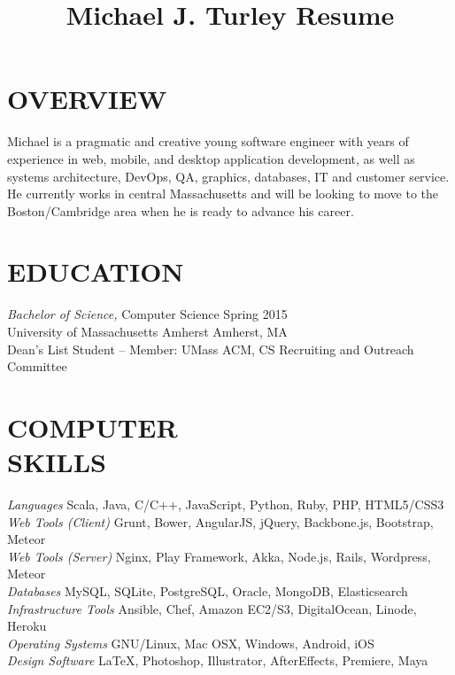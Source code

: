 \documentclass[line,margin]{res}
\begin{document}
\title{Michael J. Turley Resume}

\address{837 Partridgeville Road Unit D2, Athol, MA 01331}
\address{781-264-6283  |  mike@miketurley.com | github.com/mturley}

\begin{resume}
 
\section{OVERVIEW}
    Michael is a pragmatic and creative young software engineer with years of experience in web, mobile, and desktop application development, as well as systems architecture, DevOps, QA, graphics, databases, IT and customer service.  He currently works in central Massachusetts and will be looking to move to the Boston/Cambridge area when he is ready to advance his career.
 
\section{EDUCATION}
    {\sl Bachelor of Science,} Computer Science \hfill Spring 2015 \\
    University of Massachusetts Amherst \hfill Amherst, MA \\
    Dean's List Student -- Member: UMass ACM, CS Recruiting and Outreach Committee

 
\section{COMPUTER \\ SKILLS}
    {\sl Languages} \hfill Scala, Java, C/C++, JavaScript, Python, Ruby, PHP, HTML5/CSS3 \\
    {\sl Web Tools (Client)} \hfill Grunt, Bower, AngularJS, jQuery, Backbone.js, Bootstrap, Meteor \\
    {\sl Web Tools (Server)} \hfill Nginx, Play Framework, Akka, Node.js, Rails, Wordpress, Meteor \\
    {\sl Databases} \hfill MySQL, SQLite, PostgreSQL, Oracle, MongoDB, Elasticsearch \\
    {\sl Infrastructure Tools} \hfill Ansible, Chef, Amazon EC2/S3, DigitalOcean, Linode, Heroku \\
    {\sl Operating Systems} \hfill GNU/Linux, Mac OSX, Windows, Android, iOS \\
    {\sl Design Software} \hfill \LaTeX, Photoshop, Illustrator, AfterEffects, Premiere, Maya
 

\end{resume}
\end{document}

